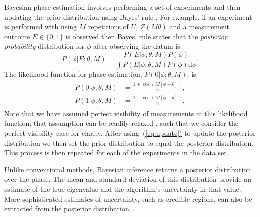 \documentclass[aps,pra,amsmath,twocolumn,amssymb,superscriptaddress]{revtex4-1}
\newcommand{\eq}[1]{\hyperref[eq:#1]{(\ref*{eq:#1})}}
\begin{document}
Bayesian phase estimation involves performing a 
set of experiments and then updating the prior distribution using Bayes' rule
\cite{berry_optimal_2000,berry_optimal_2001,SHF14}.
For example, if an experiment is performed with using $M$ repetitions of $U$,
$Z(M \theta)$ and a measurement outcome $E\in \{0,1\}$ is observed then Bayes'
rule states that the \emph{posterior probability} distribution for $\phi$
after observing the datum is
\begin{equation}
P(\phi|E;\theta,M) = \frac{P(E|\phi;\theta,M)P(\phi)}{\int P(E|\phi;\theta,M)P(\phi)\mathrm{d}{\phi}}.\label{eq:update}
\end{equation}
The likelihood
function for phase estimation, $P(0|\phi;\theta,M)$,  is
\begin{gather}
    \label{eq:likenodecohere}
    \begin{aligned}
        P(0|\phi;\theta,M) & = \frac{1+\cos(M[\phi +\theta])}{2},\\
        P(1|\phi;\theta,M) & = \frac{1-\cos(M[\phi +\theta])}{2}.
    \end{aligned}
\end{gather}
Note that we have assumed perfect visibility of measurements in this likelihood function;
that assumption can be readily relaxed \cite{ferrie_how_2013,cappellaro_spin_2012}, such that
we consider the perfect visibility case for clarity.
After using~\eq{update} to update the posterior distribution we then set the prior distribution to equal the posterior distribution.  This process is then repeated for each of the experiments in the data set.

Unlike conventional methods, Bayesian inference returns a posterior
distribution over the phase. The mean and standard deviation of this
distribution provide an estimate of the true eigenvalue and the algorithm's
uncertainty in that value. More sophisticated estimates of uncertainty, such
as credible regions, can also be extracted from the posterior
distribution~\cite{granade_robust_2012,ferrie_high_2014}.  

\end{document}
